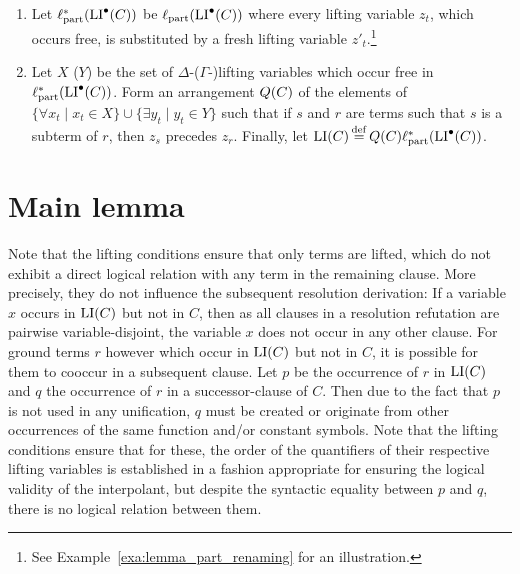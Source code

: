 \begin{defi}
\begin{enumerate}
		\item 
Let $\ell_\mathrm{part}^*(\operatorname{LI}^\bullet(C))$ be 
$\ell_\mathrm{part}(\operatorname{LI}^\bullet(C))$  where every lifting variable $z_t$, which occurs free, is substituted by a fresh lifting variable $z'_{t}$.\footnote{See Example~\ref{exa:lemma_part_renaming} for an illustration.} 
\label{lemma_part_renaming}

		\item Let $X$ ($Y$) be the set of $\Delta$-($\Gamma$-)lifting variables which occur free in  
			$\ell_\mathrm{part}^*(\operatorname{LI}^\bullet(C))$.
			Form an arrangement $Q(C)$ of the elements of $\{\forall x_t \mid x_t \in X\}\cup\allowbreak\{\exists y_t \mid y_t \in Y\}$ such that if $s$ and $r$ are terms such that $s$ is a subterm of $r$, then $z_s$ precedes\nolinebreak{} $z_r$.
			Finally, let $\LI(C) \defeq Q(C) \lifpart^*(\LIpre(C))$.
			\qedhere
	\end{enumerate}
\end{defi}






\section{Main lemma}
Note that the lifting conditions ensure that only terms are lifted,
which do not exhibit a direct logical relation with any term in the remaining clause.
More precisely, they do not influence the subsequent resolution derivation: 
If a variable $x$ occurs in $\operatorname{LI}(C)$ but not in $C$, then as all clauses in a resolution refutation are pairwise variable-disjoint, the variable $x$ does not occur in any other clause.
For ground terms $r$ however which occur in $\operatorname{LI}(C)$ but not in $C$,
it is possible for them to cooccur in a subsequent clause. Let $p$ be the occurrence of $r$ in $\operatorname{LI}(C)$ and $q$ the occurrence of $r$ in a successor-clause of $C$.
Then due to the fact that $p$ is not used in any unification, 
$q$ must be created or originate from other occurrences of the same function and/or constant symbols.
Note that the lifting conditions ensure that for these, the order of the quantifiers of their respective lifting variables is established in a fashion appropriate for ensuring the logical validity of the interpolant, but despite the syntactic equality between $p$ and $q$, there is no logical relation between them.

